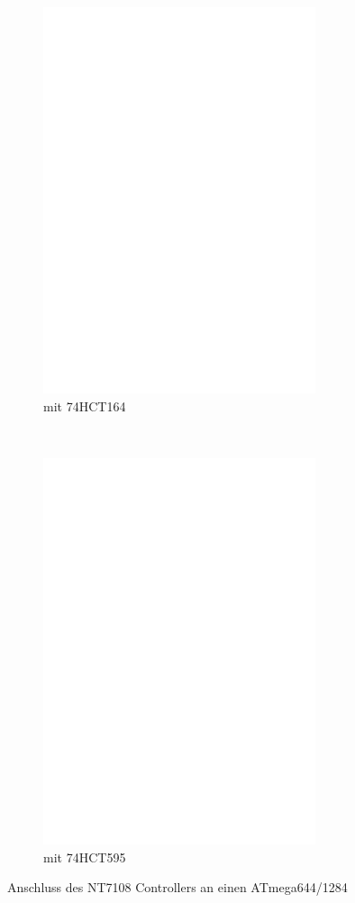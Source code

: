 \begin{figure}[H]
  \begin{subfigure}[b]{9cm}
    \centering
    \includegraphics[width=8cm]{../FIG/ST7108serial164_644.eps}
    \caption{mit 74HCT164}
  \end{subfigure}
  ~
  \begin{subfigure}[b]{9cm}
    \centering
    \includegraphics[width=8cm]{../FIG/ST7108serial595_644.eps}
    \caption{mit 74HCT595}
  \end{subfigure}
  \caption{Anschluss des NT7108 Controllers an einen ATmega644/1284}
  \label{fig:NT7108lcd_644}
\end{figure}



